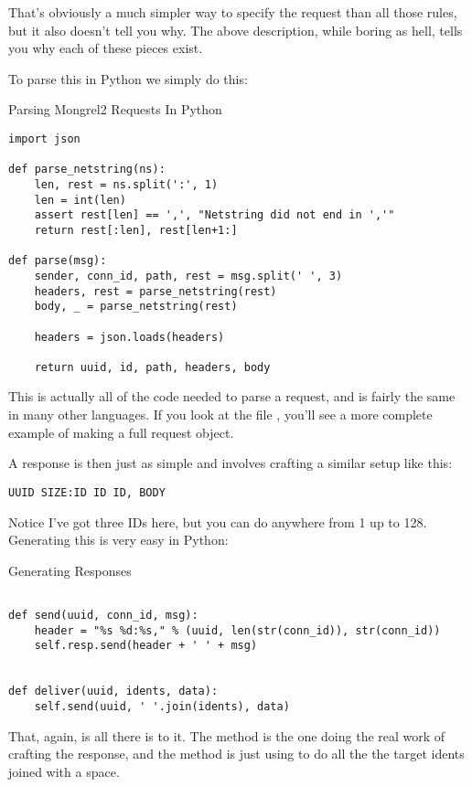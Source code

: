 That's obviously a much simpler way to specify the request than all those
rules, but it also doesn't tell you why.  The above description, while
boring as hell, tells you why each of these pieces exist.

To parse this in Python we simply do this:

\begin{code}{Parsing Mongrel2 Requests In Python}
\begin{lstlisting}
import json

def parse_netstring(ns):
    len, rest = ns.split(':', 1)
    len = int(len)
    assert rest[len] == ',', "Netstring did not end in ','"
    return rest[:len], rest[len+1:]

def parse(msg):
    sender, conn_id, path, rest = msg.split(' ', 3)
    headers, rest = parse_netstring(rest)
    body, _ = parse_netstring(rest)

    headers = json.loads(headers)

    return uuid, id, path, headers, body
\end{lstlisting}
\end{code}

This is actually all of the code needed to parse a request, and is
fairly the same in many other languages.  If you look at the file
, you'll see a more complete
example of making a full request object.

A response is then just as simple and involves crafting a similar
setup like this:

\begin{lstlisting}
UUID SIZE:ID ID ID, BODY
\end{lstlisting}

Notice I've got three IDs here, but you can do anywhere from 1 up to 128.  Generating
this is very easy in Python:

\begin{code}{Generating Responses}
\begin{lstlisting}

def send(uuid, conn_id, msg):
    header = "%s %d:%s," % (uuid, len(str(conn_id)), str(conn_id))
    self.resp.send(header + ' ' + msg)


def deliver(uuid, idents, data):
    self.send(uuid, ' '.join(idents), data)

\end{lstlisting}
\end{code}

That, again, is all there is to it.  The  method is the
one doing the real work of crafting the response, and the 
method is just using  to do all the the target idents
joined with a space.


